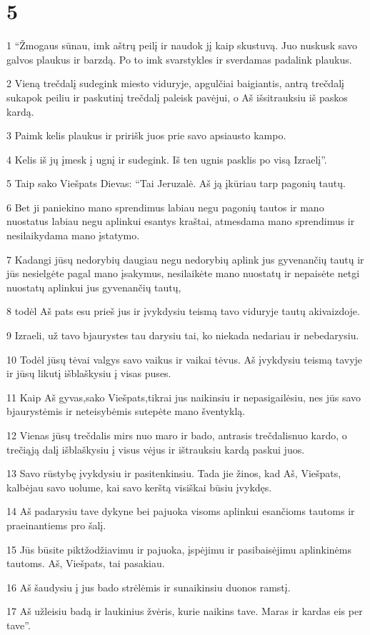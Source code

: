 \chapter{5}


\par 1 “Žmogaus sūnau, imk aštrų peilį ir naudok jį kaip skustuvą. Juo nuskusk savo galvos plaukus ir barzdą. Po to imk svarstykles ir sverdamas padalink plaukus. 
\par 2 Vieną trečdalį sudegink miesto viduryje, apgulčiai baigiantis, antrą trečdalį sukapok peiliu ir paskutinį trečdalį paleisk pavėjui, o Aš išsitrauksiu iš paskos kardą. 
\par 3 Paimk kelis plaukus ir pririšk juos prie savo apsiausto kampo. 
\par 4 Kelis iš jų įmesk į ugnį ir sudegink. Iš ten ugnis pasklis po visą Izraelį”. 
\par 5 Taip sako Viešpats Dievas: “Tai Jeruzalė. Aš ją įkūriau tarp pagonių tautų. 
\par 6 Bet ji paniekino mano sprendimus labiau negu pagonių tautos ir mano nuostatus labiau negu aplinkui esantys kraštai, atmesdama mano sprendimus ir nesilaikydama mano įstatymo. 
\par 7 Kadangi jūsų nedorybių daugiau negu nedorybių aplink jus gyvenančių tautų ir jūs nesielgėte pagal mano įsakymus, nesilaikėte mano nuostatų ir nepaisėte netgi nuostatų aplinkui jus gyvenančių tautų, 
\par 8 todėl Aš pats esu prieš jus ir įvykdysiu teismą tavo viduryje tautų akivaizdoje. 
\par 9 Izraeli, už tavo bjaurystes tau darysiu tai, ko niekada nedariau ir nebedarysiu. 
\par 10 Todėl jūsų tėvai valgys savo vaikus ir vaikai tėvus. Aš įvykdysiu teismą tavyje ir jūsų likutį išblaškysiu į visas puses. 
\par 11 Kaip Aš gyvas,­sako Viešpats,­tikrai jus naikinsiu ir nepasigailėsiu, nes jūs savo bjaurystėmis ir neteisybėmis sutepėte mano šventyklą. 
\par 12 Vienas jūsų trečdalis mirs nuo maro ir bado, antrasis trečdalis­nuo kardo, o trečiąją dalį išblaškysiu į visus vėjus ir ištrauksiu kardą paskui juos. 
\par 13 Savo rūstybę įvykdysiu ir pasitenkinsiu. Tada jie žinos, kad Aš, Viešpats, kalbėjau savo uolume, kai savo kerštą visiškai būsiu įvykdęs. 
\par 14 Aš padarysiu tave dykyne bei pajuoka visoms aplinkui esančioms tautoms ir praeinantiems pro šalį. 
\par 15 Jūs būsite piktžodžiavimu ir pajuoka, įspėjimu ir pasibaisėjimu aplinkinėms tautoms. Aš, Viešpats, tai pasakiau. 
\par 16 Aš šaudysiu į jus bado strėlėmis ir sunaikinsiu duonos ramstį. 
\par 17 Aš užleisiu badą ir laukinius žvėris, kurie naikins tave. Maras ir kardas eis per tave”.



